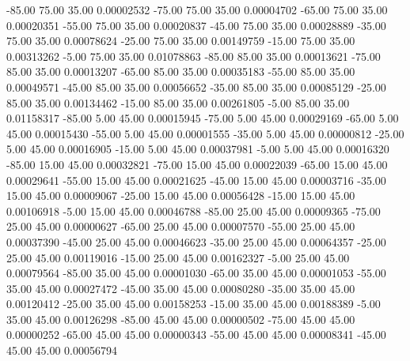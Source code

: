     -85.00     75.00     35.00     0.00002532
    -75.00     75.00     35.00     0.00004702
    -65.00     75.00     35.00     0.00020351
    -55.00     75.00     35.00     0.00020837
    -45.00     75.00     35.00     0.00028889
    -35.00     75.00     35.00     0.00078624
    -25.00     75.00     35.00     0.00149759
    -15.00     75.00     35.00     0.00313262
     -5.00     75.00     35.00     0.01078863
    -85.00     85.00     35.00     0.00013621
    -75.00     85.00     35.00     0.00013207
    -65.00     85.00     35.00     0.00035183
    -55.00     85.00     35.00     0.00049571
    -45.00     85.00     35.00     0.00056652
    -35.00     85.00     35.00     0.00085129
    -25.00     85.00     35.00     0.00134462
    -15.00     85.00     35.00     0.00261805
     -5.00     85.00     35.00     0.01158317
    -85.00      5.00     45.00     0.00015945
    -75.00      5.00     45.00     0.00029169
    -65.00      5.00     45.00     0.00015430
    -55.00      5.00     45.00     0.00001555
    -35.00      5.00     45.00     0.00000812
    -25.00      5.00     45.00     0.00016905
    -15.00      5.00     45.00     0.00037981
     -5.00      5.00     45.00     0.00016320
    -85.00     15.00     45.00     0.00032821
    -75.00     15.00     45.00     0.00022039
    -65.00     15.00     45.00     0.00029641
    -55.00     15.00     45.00     0.00021625
    -45.00     15.00     45.00     0.00003716
    -35.00     15.00     45.00     0.00009067
    -25.00     15.00     45.00     0.00056428
    -15.00     15.00     45.00     0.00106918
     -5.00     15.00     45.00     0.00046788
    -85.00     25.00     45.00     0.00009365
    -75.00     25.00     45.00     0.00000627
    -65.00     25.00     45.00     0.00007570
    -55.00     25.00     45.00     0.00037390
    -45.00     25.00     45.00     0.00046623
    -35.00     25.00     45.00     0.00064357
    -25.00     25.00     45.00     0.00119016
    -15.00     25.00     45.00     0.00162327
     -5.00     25.00     45.00     0.00079564
    -85.00     35.00     45.00     0.00001030
    -65.00     35.00     45.00     0.00001053
    -55.00     35.00     45.00     0.00027472
    -45.00     35.00     45.00     0.00080280
    -35.00     35.00     45.00     0.00120412
    -25.00     35.00     45.00     0.00158253
    -15.00     35.00     45.00     0.00188389
     -5.00     35.00     45.00     0.00126298
    -85.00     45.00     45.00     0.00000502
    -75.00     45.00     45.00     0.00000252
    -65.00     45.00     45.00     0.00000343
    -55.00     45.00     45.00     0.00008341
    -45.00     45.00     45.00     0.00056794

